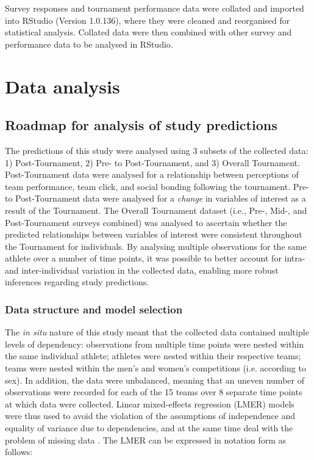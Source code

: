 \begin{CJK}{UTF8}{gbsn}
Survey responses and tournament performance data were collated and imported into RStudio (Version 1.0.136), where they were cleaned and reorganised for statistical analysis. Collated data were then combined with other survey and performance data to be analysed in RStudio.






\clearpage
\section{Data analysis}

\subsection{Roadmap for analysis of study predictions}
The predictions of this study were analysed using 3 subsets of the collected data: 1) Post-Tournament, 2) Pre- to Post-Tournament, and 3) Overall Tournament.  Post-Tournament data were analysed for a relationship between perceptions of team performance, team click, and social bonding following the tournament.  Pre- to Post-Tournament data were analysed for a \textit{change} in variables of interest as a result of the Tournament.  The Overall Tournament dataset (i.e., Pre-, Mid-, and Post-Tournament surveys combined) was analysed to ascertain whether the predicted relationships between variables of interest were consistent throughout the Tournament for individuals.  By analysing multiple observations for the same athlete over a number of time points, it was possible to better account for intra- and inter-individual variation in the collected data, enabling more robust inferences regarding study predictions.

\subsubsection{Data structure and model selection\label{survey:dataStructureModelSelection}}
The \textit{in situ} nature of this study meant that the collected data contained multiple levels of dependency: observations from multiple time points were nested within the same individual athlete; athletes were nested within their respective teams; teams were nested within the men's and women's competitions (i.e. according to sex).  In addition, the data were unbalanced, meaning that an uneven number of observations were recorded for each of the 15 teams over 8 separate time points at which data were collected.  Linear mixed-effects regression (LMER) models were thus used to avoid the violation of the assumptions of independence and equality of variance due to dependencies, and at the same time deal with the problem of missing data \citep{Quene2004,Field2012}.  The LMER can be expressed in notation form as follows:


\end{CJK}
